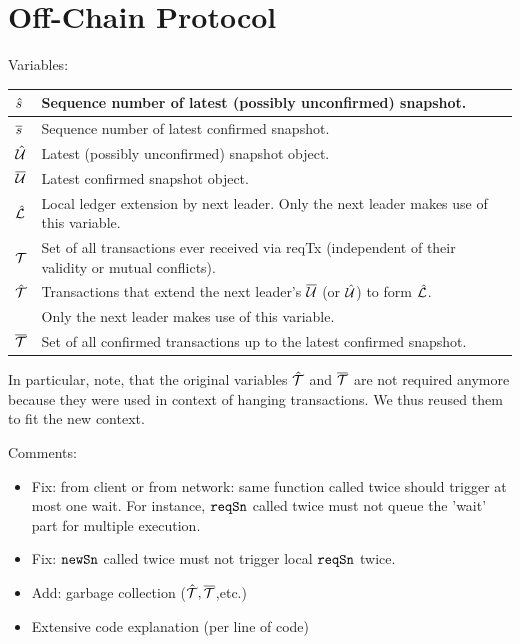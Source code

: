\section{Off-Chain Protocol}

Variables:

\begin{center}
\begin{tabular}{|l|l|}\hline
  $\hat s$  & Sequence number of latest (possibly unconfirmed) snapshot. \\ \hline
  $\overline s$  & Sequence number of latest confirmed snapshot. \\ \hline
  $\hat {\mathcal U}$ & Latest (possibly unconfirmed) snapshot object. \\ \hline
  $\overline {\mathcal U}$ & Latest confirmed snapshot object. \\ \hline
  $\hat {\mathcal L}$ & Local ledger extension by next leader. Only the next leader
  makes use of this variable.\\ \hline
  ${\mathcal T}$    & Set of all transactions ever received via reqTx (independent of their validity or mutual conflicts).\\  \hline
  $\hat {\mathcal T}$ & Transactions that extend the next leader's $\overline {\mathcal U}$ (or $\hat {\mathcal U}$) to form $\hat {\mathcal L}$.\\
           & Only the next leader makes use of this variable.\\  \hline
  $\overline {\mathcal T}$ & Set of all confirmed transactions up to the latest confirmed snapshot.\\  \hline
\end{tabular}
\end{center}

In particular, note, that the original variables $\hat {\mathcal T}$ and $\overline {\mathcal T}$ are not required anymore because they
were used in context of hanging transactions. We thus reused them to fit the new context.



Comments: 
\begin{itemize}
\item Fix: from client or from network: same function called twice should trigger at most one wait.
  For instance, $\mathtt{reqSn}$ called twice must not queue the 'wait' part for multiple execution.
\item Fix: $\mathtt{newSn}$ called twice must not trigger local $\mathtt{reqSn}$ twice.
\item Add: garbage collection ($\hat {\mathcal T},\overline {\mathcal T}$,etc.)
\item Extensive code explanation (per line of code)
\end{itemize}

